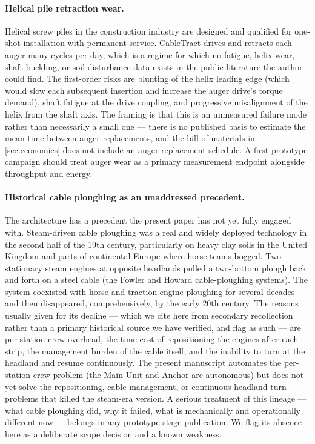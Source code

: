 \documentclass[11pt,a4paper]{article}
\begin{document}
\paragraph{Helical pile retraction wear.} Helical screw piles in the construction industry are designed and qualified for one-shot installation with permanent service. CableTract drives and retracts each auger many cycles per day, which is a regime for which no fatigue, helix wear, shaft buckling, or soil-disturbance data exists in the public literature the author could find. The first-order risks are blunting of the helix leading edge (which would slow each subsequent insertion and increase the auger drive's torque demand), shaft fatigue at the drive coupling, and progressive misalignment of the helix from the shaft axis. The framing is that this is an unmeasured failure mode rather than necessarily a small one --- there is no published basis to estimate the mean time between auger replacements, and the bill of materials in \cref{sec:economics} does not include an auger replacement schedule. A first prototype campaign should treat auger wear as a primary measurement endpoint alongside throughput and energy.

\paragraph{Historical cable ploughing as an unaddressed precedent.} The architecture has a precedent the present paper has not yet fully engaged with. Steam-driven cable ploughing was a real and widely deployed technology in the second half of the 19th century, particularly on heavy clay soils in the United Kingdom and parts of continental Europe where horse teams bogged. Two stationary steam engines at opposite headlands pulled a two-bottom plough back and forth on a steel cable (the Fowler and Howard cable-ploughing systems). The system coexisted with horse and traction-engine ploughing for several decades and then disappeared, comprehensively, by the early 20th century. The reasons usually given for its decline --- which we cite here from secondary recollection rather than a primary historical source we have verified, and flag as such --- are per-station crew overhead, the time cost of repositioning the engines after each strip, the management burden of the cable itself, and the inability to turn at the headland and resume continuously. The present manuscript automates the per-station crew problem (the Main Unit and Anchor are autonomous) but does not yet solve the repositioning, cable-management, or continuous-headland-turn problems that killed the steam-era version. A serious treatment of this lineage --- what cable ploughing did, why it failed, what is mechanically and operationally different now --- belongs in any prototype-stage publication. We flag its absence here as a deliberate scope decision and a known weakness.
\end{document}
